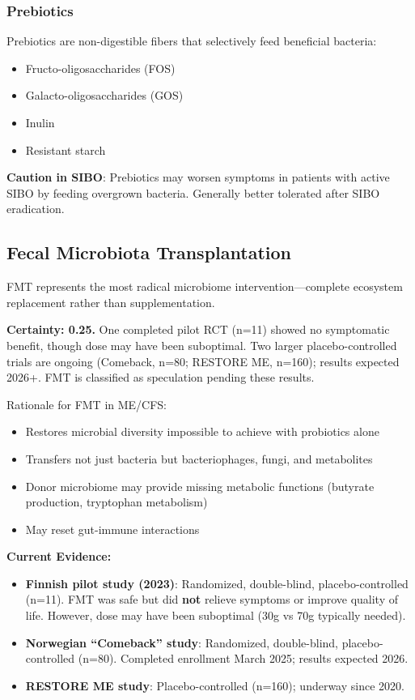 \subsubsection{Prebiotics}

Prebiotics are non-digestible fibers that selectively feed beneficial bacteria:
\begin{itemize}
    \item Fructo-oligosaccharides (FOS)
    \item Galacto-oligosaccharides (GOS)
    \item Inulin
    \item Resistant starch
\end{itemize}

\textbf{Caution in SIBO}: Prebiotics may worsen symptoms in patients with active SIBO by feeding overgrown bacteria. Generally better tolerated after SIBO eradication.

\subsection{Fecal Microbiota Transplantation}
\label{sec:fmt}

FMT represents the most radical microbiome intervention---complete ecosystem replacement rather than supplementation.

\begin{speculation}
\label{spec:fmt}
\textbf{Certainty: 0.25.} One completed pilot RCT (n=11) showed no symptomatic benefit, though dose may have been suboptimal. Two larger placebo-controlled trials are ongoing (Comeback, n=80; RESTORE ME, n=160); results expected 2026+. FMT is classified as speculation pending these results.

Rationale for FMT in ME/CFS:
\begin{itemize}
    \item Restores microbial diversity impossible to achieve with probiotics alone
    \item Transfers not just bacteria but bacteriophages, fungi, and metabolites
    \item Donor microbiome may provide missing metabolic functions (butyrate production, tryptophan metabolism)
    \item May reset gut-immune interactions
\end{itemize}
\end{speculation}

\textbf{Current Evidence:}
\begin{itemize}
    \item \textbf{Finnish pilot study (2023)}: Randomized, double-blind, placebo-controlled (n=11). FMT was safe but did \textbf{not} relieve symptoms or improve quality of life. However, dose may have been suboptimal (30g vs 70g typically needed).
    \item \textbf{Norwegian ``Comeback'' study}: Randomized, double-blind, placebo-controlled (n=80). Completed enrollment March 2025; results expected 2026.
    \item \textbf{RESTORE ME study}: Placebo-controlled (n=160); underway since 2020.
\end{itemize}

